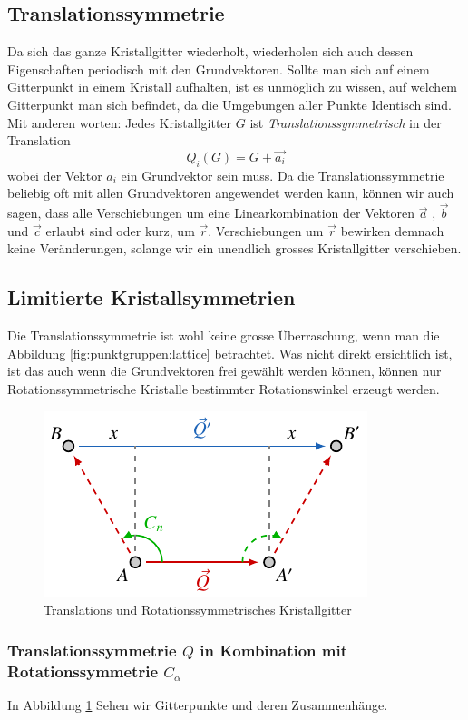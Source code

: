 \subsection{Translationssymmetrie}
Da sich das ganze Kristallgitter wiederholt, wiederholen sich auch dessen Eigenschaften periodisch mit den Grundvektoren.
Sollte man sich auf einem Gitterpunkt in einem Kristall aufhalten, ist es unmöglich zu wissen, auf welchem Gitterpunkt man sich befindet, 
da die Umgebungen aller Punkte Identisch sind. 
Mit anderen worten: Jedes Kristallgitter $ G $ ist \emph{Translationssymmetrisch} in der Translation 
\[
    Q_i(G) = G + \vec{a_i}
\] wobei der Vektor $a_i$ ein Grundvektor sein muss.
Da die Translationssymmetrie beliebig oft mit allen Grundvektoren angewendet werden kann, 
können wir auch sagen, dass alle Verschiebungen um eine Linearkombination 
der Vektoren $\vec{a}$ , $\vec{b}$ und $\vec{c}$ erlaubt sind oder kurz, um $\vec{r}$. 
Verschiebungen um $\vec{r}$ bewirken demnach keine Veränderungen, 
solange wir ein unendlich grosses Kristallgitter verschieben.

\subsection{Limitierte Kristallsymmetrien}
 Die Translationssymmetrie ist wohl keine grosse Überraschung, wenn man die Abbildung \ref{fig:punktgruppen:lattice} betrachtet.
 Was nicht direkt ersichtlich ist, ist das auch wenn die Grundvektoren frei gewählt werden können, 
 können nur Rotationssymmetrische Kristalle bestimmter Rotationswinkel erzeugt werden.

\begin{figure}
    \centering
    \includegraphics[]{papers/punktgruppen/figures/combine-symmetries}
    \caption{
        Translations und Rotationssymmetrisches Kristallgitter
    }
    \label{fig:punktgruppen:rot-geometry}
\end{figure}

 \subsubsection{Translationssymmetrie $Q$ in Kombination mit Rotationssymmetrie $C_\alpha$}     %
 In Abbildung \ref{fig:punktgruppen:rot-geometry} Sehen wir Gitterpunkte und deren Zusammenhänge.

